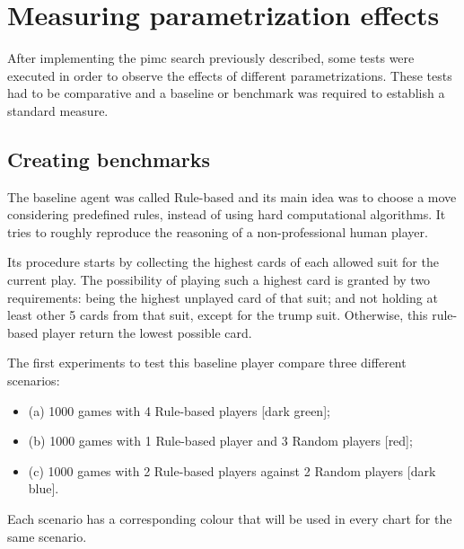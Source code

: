 \section{Measuring parametrization effects}
\label{sec:parametrizing}

After implementing the \ac{pimc} search previously described, some tests were executed in order to observe the effects of different parametrizations.
These tests had to be comparative and a baseline or benchmark was required to establish a standard measure.


\subsection{Creating benchmarks}
The baseline agent was called Rule-based and its main idea was to choose a move considering predefined rules, instead of using hard computational algorithms.
It tries to roughly reproduce the reasoning of a non-professional human player.

Its procedure starts by collecting the highest cards of each allowed suit for the current play.
The possibility of playing such a highest card is granted by two requirements: being the highest unplayed card of that suit; and not holding at least other 5 cards from that suit, except for the trump suit.
Otherwise, this rule-based player return the lowest possible card.

The first experiments to test this baseline player compare three different scenarios:
\begin{itemize}
\item (a) 1000 games with 4 Rule-based players [dark green];
\item (b) 1000 games with 1 Rule-based player and 3 Random players [red];
\item (c) 1000 games with 2 Rule-based players against 2 Random players [dark blue].
\end{itemize}
Each scenario has a corresponding colour that will be used in every chart for the same scenario.

